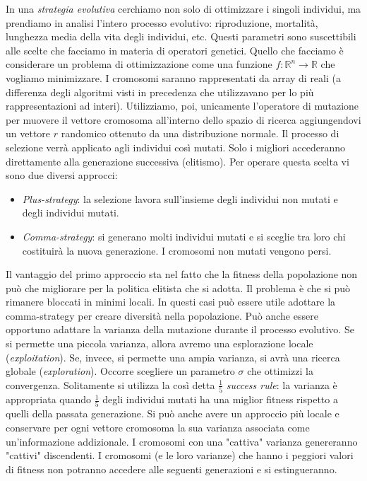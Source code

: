 \documentclass[10pt,a4paper]{article}
\begin{document}
In una \emph{strategia evolutiva} cerchiamo non solo di ottimizzare i singoli individui, ma prendiamo in analisi l'intero processo evolutivo: riproduzione, mortalità, lunghezza media della vita degli individui, etc. Questi parametri sono suscettibili alle scelte che facciamo in materia di operatori genetici. Quello che facciamo è considerare un problema di ottimizzazione come una funzione $f: \mathbb{R}^n \to \mathbb{R}$ che vogliamo minimizzare. I cromosomi saranno rappresentati da array di reali (a differenza degli algoritmi visti in precedenza che utilizzavano per lo più rappresentazioni ad interi). Utilizziamo, poi, unicamente l'operatore di mutazione per muovere il vettore cromosoma all'interno dello spazio di ricerca aggiungendovi un vettore $r$ randomico ottenuto da una distribuzione normale. Il processo di selezione verrà applicato agli individui così mutati. Solo i migliori accederanno direttamente alla generazione successiva (elitismo). Per operare questa scelta vi sono due diversi approcci:

\begin{itemize}
\item{\emph{Plus-strategy}: la selezione lavora sull'insieme degli individui non mutati e degli individui mutati. }
\item{\emph{Comma-strategy}: si generano molti individui mutati e si sceglie tra loro chi costituirà la nuova generazione. I cromosomi non mutati vengono persi.}
\end{itemize}

Il vantaggio del primo approccio sta nel fatto che la fitness della popolazione non può che migliorare per la politica elitista che si adotta. Il problema è che si può rimanere bloccati in minimi locali. In questi casi può essere utile adottare la comma-strategy per creare diversità nella popolazione. Può anche essere opportuno adattare la varianza della mutazione durante il processo evolutivo. Se si permette una piccola varianza, allora avremo una esplorazione locale (\emph{exploitation}). Se, invece, si permette una ampia varianza, si avrà una ricerca globale (\emph{exploration}). Occorre scegliere un parametro $\sigma$ che ottimizzi la convergenza. Solitamente si utilizza la così detta $\frac{1}{5}$ \emph{success rule}: la varianza è appropriata quando $\frac{1}{5}$ degli individui mutati ha una miglior fitness rispetto a quelli della passata generazione. Si può anche avere un approccio più locale e conservare per ogni vettore cromosoma la sua varianza associata come un'informazione addizionale. I cromosomi con una "cattiva" varianza genereranno "cattivi" discendenti. I cromosomi (e le loro varianze) che hanno i peggiori valori di fitness non potranno accedere alle seguenti generazioni e si estingueranno. 
\end{document}
